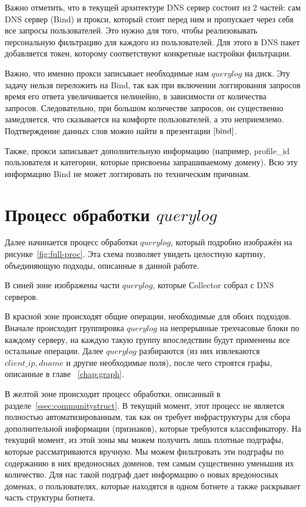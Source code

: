 \documentclass[a4paper,14pt]{extreport} %
\begin{document}
Важно отметить, что в текущей архитектуре DNS сервер состоит из 2 частей: сам DNS сервер (Bind) и прокси, который стоит перед ним и пропускает через себя все запросы пользователей. Это нужно для того, чтобы реализовывать персональную фильтрацию для каждого из пользователей. Для этого в DNS пакет добавляется токен, которому соответствуют конкретные настройки фильтрации. 

Важно, что именно прокси записывает необходимые нам $querylog$ на диск. Эту задачу нельзя переложить на Bind, так как при включении логгирования запросов время его ответа увеличивается нелинейно, в зависимости от количества запросов. Следовательно, при большом количестве запросов, он существенно замедляется, что сказывается на комфорте пользователей, а это неприемлемо. Подтверждение данных слов можно найти в презентации  $\cite{bind}$.

Также, прокси записывает дополнительную информацию (например, profile\_id пользователя и категории, которые присвоены запрашиваемому домену). Всю эту информацию Bind не может логгировать по техническим причинам.

\section{Процесс обработки $querylog$}

Далее начинается процесс обработки $querylog$, который подробно изображён на  рисунке~\ref{fig:full-proc}. Эта схема позволяет увидеть целостную картину, объединяющую подходы, описанные в данной работе.


В синей зоне изображены части $querylog$, которые Сollector собрал с DNS серверов.

В красной зоне происходят общие операции, необходимые для обоих подходов. Вначале происходит группировка $querylog$ на непрерывные трехчасовые блоки по каждому серверу, на каждую такую группу впоследствии будут применены все остальные операции. Далее $querylog$ разбираются (из них извлекаются $client\_ip, dname$ и другие необходимые поля), после чего строятся графы, описанные в главе ~\ref{chap:graph}. 

В желтой зоне происходит процесс обработки, описанный в разделе~\ref{ssec:communitystruct}. В текущий момент, этот процесс не является полностью автоматизированным, так как он требует инфраструктуры для сбора дополнительной информации (признаков), которые требуются классификатору. На текущий момент, из этой зоны мы можем получить лишь плотные подграфы, которые рассматриваются вручную. Мы можем фильтровать эти подграфы по содержанию в них вредоносных доменов, тем самым существенно уменьшив их количество. Для нас такой подграф дает информацию о новых вредоносных доменах, о пользователях, которые находятся в одном ботнете а также раскрывает часть структуры ботнета.
\end{document}
